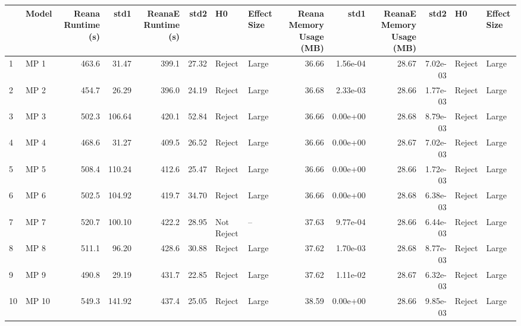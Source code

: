 \begin{tabular}{llrrrrllrrrrll}
\toprule
{} &  Model &  Reana Runtime (s) &    std1 &  ReanaE Runtime (s) &   std2 &          H0 & Effect Size &  Reana Memory Usage (MB) &      std1 &  ReanaE Memory Usage (MB) &      std2 &      H0 & Effect Size \\
\midrule
1  &   MP 1 &              463.6 &   31.47 &               399.1 &  27.32 &      Reject &       Large &                    36.66 &  1.56e-04 &                     28.67 &  7.02e-03 &  Reject &       Large \\
2  &   MP 2 &              454.7 &   26.29 &               396.0 &  24.19 &      Reject &       Large &                    36.68 &  2.33e-03 &                     28.66 &  1.77e-03 &  Reject &       Large \\
3  &   MP 3 &              502.3 &  106.64 &               420.1 &  52.84 &      Reject &       Large &                    36.66 &  0.00e+00 &                     28.68 &  8.79e-03 &  Reject &       Large \\
4  &   MP 4 &              468.6 &   31.27 &               409.5 &  26.52 &      Reject &       Large &                    36.66 &  0.00e+00 &                     28.67 &  7.02e-03 &  Reject &       Large \\
5  &   MP 5 &              508.4 &  110.24 &               412.6 &  25.47 &      Reject &       Large &                    36.66 &  0.00e+00 &                     28.66 &  1.72e-03 &  Reject &       Large \\
6  &   MP 6 &              502.5 &  104.92 &               419.7 &  34.70 &      Reject &       Large &                    36.66 &  0.00e+00 &                     28.68 &  6.38e-03 &  Reject &       Large \\
7  &   MP 7 &              520.7 &  100.10 &               422.2 &  28.95 &  Not Reject &          -- &                    37.63 &  9.77e-04 &                     28.66 &  6.44e-03 &  Reject &       Large \\
8  &   MP 8 &              511.1 &   96.20 &               428.6 &  30.88 &      Reject &       Large &                    37.62 &  1.70e-03 &                     28.68 &  8.77e-03 &  Reject &       Large \\
9  &   MP 9 &              490.8 &   29.19 &               431.7 &  22.85 &      Reject &       Large &                    37.62 &  1.11e-02 &                     28.67 &  6.32e-03 &  Reject &       Large \\
10 &  MP 10 &              549.3 &  141.92 &               437.4 &  25.05 &      Reject &       Large &                    38.59 &  0.00e+00 &                     28.66 &  9.85e-03 &  Reject &       Large \\

\end{tabular}
